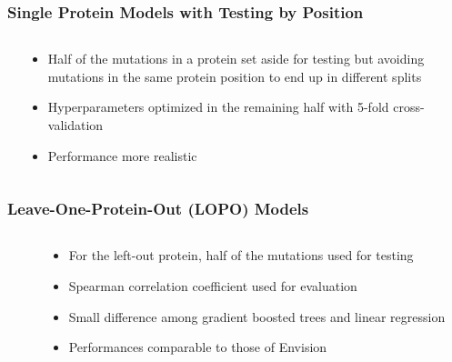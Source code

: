 \documentclass[10pt, british]{beamer}
\begin{document}
\begin{frame}
	\frametitle{Single Protein Models with Testing by Position}
	\begin{columns}[c]
		\begin{column}{.6\textwidth}
			\centering%
			\vspace{1em}
			{%
				\let\bfseries\sbseries%
				
			}
		\end{column}
		\begin{column}{.4\textwidth}
			\begin{itemize}
				\item Half of the mutations in a protein set aside for testing but avoiding mutations in the same protein position to end up in different splits
				\item Hyperparameters optimized in the remaining half with 5-fold cross-validation
				\item Performance more realistic
			\end{itemize}
		\end{column}
	\end{columns}
\end{frame}

\begin{frame}
	\frametitle{Leave-One-Protein-Out (LOPO) Models}
	\begin{columns}[c]
		\begin{column}{.6\textwidth}
			\centering%
			\vspace{1em}
			{%
				\let\bfseries\sbseries%
				
			}
		\end{column}
		\begin{column}{.4\textwidth}
			\begin{itemize}
				\item For the left-out protein, half of the mutations used for testing
				\item Spearman correlation coefficient used for evaluation
				\item Small difference among gradient boosted trees and linear regression
				\item Performances comparable to those of Envision
			\end{itemize}
		\end{column}
	\end{columns}
\end{frame}
\end{document}

